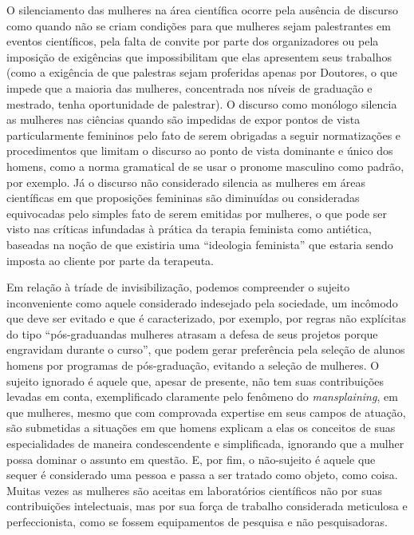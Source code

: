 O silenciamento das mulheres na área científica ocorre pela ausência de discurso como quando não se criam condições para que mulheres sejam palestrantes em eventos científicos, pela falta de convite por parte dos organizadores ou pela imposição de exigências que impossibilitam que elas apresentem seus trabalhos (como a exigência de que palestras sejam proferidas apenas por Doutores, o que impede que a maioria das mulheres, concentrada nos níveis de graduação e mestrado, tenha oportunidade de palestrar). O discurso como monólogo silencia as mulheres nas ciências quando são impedidas de expor pontos de vista particularmente femininos pelo fato de serem obrigadas a seguir normatizações e procedimentos que limitam o discurso ao ponto de vista dominante e único dos homens, como a norma gramatical de se usar o pronome masculino como padrão, por exemplo. Já o discurso não considerado silencia as mulheres em áreas científicas em que proposições femininas são diminuídas ou consideradas equivocadas pelo simples fato de serem emitidas por mulheres, o que pode ser visto nas críticas infundadas à prática da terapia feminista como antiética, baseadas na noção de que existiria uma “ideologia feminista” que estaria sendo imposta ao cliente por parte da terapeuta.

Em relação à tríade de invisibilização, podemos compreender o sujeito inconveniente como aquele considerado indesejado pela sociedade, um incômodo que deve ser evitado e que é caracterizado, por exemplo, por regras não explícitas do tipo “pós-graduandas mulheres atrasam a defesa de seus projetos porque engravidam durante o curso”, que podem gerar preferência pela seleção de alunos homens por programas de pós-graduação, evitando a seleção de mulheres. O sujeito ignorado é aquele que, apesar de presente, não tem suas contribuições levadas em conta, exemplificado claramente pelo fenômeno do \textit{mansplaining}, em que mulheres, mesmo que com comprovada expertise em seus campos de atuação, são submetidas a situações em que homens explicam a elas os conceitos de suas especialidades de maneira condescendente e simplificada, ignorando que a mulher possa dominar o assunto em questão. E, por fim, o não-sujeito é aquele que sequer é considerado uma pessoa e passa a ser tratado como objeto, como coisa. Muitas vezes as mulheres são aceitas em laboratórios científicos não por suas contribuições intelectuais, mas por sua força de trabalho considerada meticulosa e perfeccionista, como se fossem equipamentos de pesquisa e não pesquisadoras.

